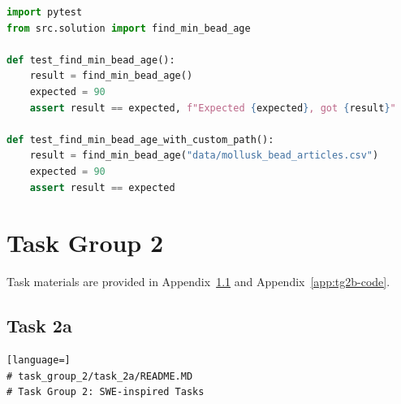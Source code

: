 \begin{appendices}
\begin{lstlisting}[language=Python]
import pytest
from src.solution import find_min_bead_age

def test_find_min_bead_age():
    result = find_min_bead_age()
    expected = 90
    assert result == expected, f"Expected {expected}, got {result}"

def test_find_min_bead_age_with_custom_path():
    result = find_min_bead_age("data/mollusk_bead_articles.csv")
    expected = 90
    assert result == expected
\end{lstlisting}

\section{Task Group 2}
Task materials are provided in Appendix~\ref{app:tg2a-code} and Appendix~\ref{app:tg2b-code}.
\begin{figure}[ht]
\setlength{\fboxsep}{5pt}
\centering
\begin{minipage}[t]{1\textwidth}
\end{minipage}
\end{figure}

\subsection{Task 2a}
\label{app:tg2a-code}
\begin{lstlisting}[language=]
# task_group_2/task_2a/README.MD
# Task Group 2: SWE-inspired Tasks


\end{lstlisting}
\end{appendices}
